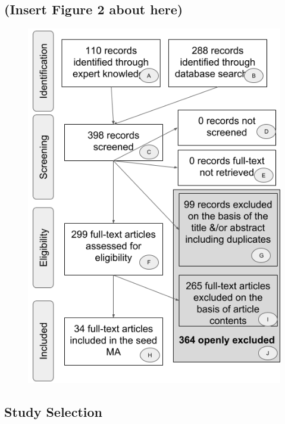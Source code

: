 \documentclass[man]{apa6}
\theoremstyle{definition}
\theoremstyle{definition}
\theoremstyle{definition}
\theoremstyle{remark}
\begin{document}
\subsection{(Insert Figure 2 about
here)}\label{insert-figure-2-about-here}

\begin{figure}
\centering
\includegraphics{figures/PRISMA_MA_Mispronunciation.png}
\caption{}
\end{figure}

\subsection{Study Selection}\label{study-selection}
\end{document}
